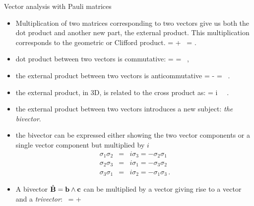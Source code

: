 \documentclass[10pt]{beamer}
\begin{document}
\begin{frame}[fragile]{Vector analysis with Pauli matrices}
\begin{itemize}
\item Multiplication of two matrices corresponding to two vectors give us both the dot product and another new part, the external product. \alert{This multiplication corresponds to the geometric or Clifford product.
%
\be \label{funids}
\Ba  \Bb =  \Ba \cdot \Bb + \Ba \wedge \Bb \, = \ta \tb.
\ee
%
}
\item \alert{dot product} between two vectors \alert{is commutative}: 
%
\be \label{intdef}
\Ba \cdot \Bb = \Bb \cdot \Ba =  \, ,
\ee
%
\item \alert{the external product} between two vectors \alert{is anticommutative}
%
\be \label{extdef}
\Ba \wedge \Bb = - \Bb \wedge \Ba = \, .
\ee
%
\item the external product, in 3D, is related to the cross product as:
%
\be \label{epcross3}
\Ba \wedge \Bb =  i \, \Ba \times \Bb \, .
\ee
%
\end{itemize}

\end{frame}

\begin{frame}[fragile]{}
\begin{itemize}
\item the external product between two vectors introduces a new subject:  \emph{the bivector}.
\item the bivector can be expressed either showing the two vector components or a single vector component but multiplied by $i$ 
%
\begin {eqnarray}
\sigma_1 \sigma_2 &=& i \sigma_3  = - \sigma_2 \sigma_1 \nonumber \\
\sigma_2 \sigma_3 &=& i \sigma_1 =  - \sigma_3  \sigma_2\nonumber \\
\sigma_3 \sigma_1 &=&  i \sigma_2 =  - \sigma_1  \sigma_3 \,.
\label{sigmacomb}
 \end{eqnarray}
\item 
A bivector $\hat{\mathbf{B}} = \mathbf{b} \wedge \mathbf{c}$ can be multiplied by a vector giving rise to a vector and a \emph{trivector}:
\be \label{aB}
\Ba \, \hat{\BB} = \Ba \cdot \hat{\BB} + \Ba \wedge \hat{\BB}
\ee
\end{itemize}

\end{frame}
\end{document}
